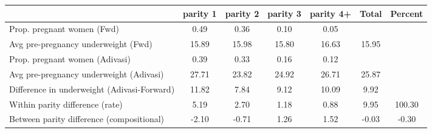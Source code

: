 \begin{tabular}{l*{6}{c}}
\toprule
            &\multicolumn{1}{c}{parity 1}&\multicolumn{1}{c}{parity 2}&\multicolumn{1}{c}{parity 3}&\multicolumn{1}{c}{parity 4+}&\multicolumn{1}{c}{Total}&\multicolumn{1}{c}{Percent}\\
\midrule
\midrule
Prop. pregnant women (Fwd)&        0.49&        0.36&        0.10&        0.05&            &            \\
Avg pre-pregnancy underweight (Fwd)&       15.89&       15.98&       15.80&       16.63&       15.95&            \\
Prop. pregnant women (Adivasi)&        0.39&        0.33&        0.16&        0.12&            &            \\
Avg pre-pregnancy underweight (Adivasi)&       27.71&       23.82&       24.92&       26.71&       25.87&            \\
Difference in underweight (Adivasi-Forward)&       11.82&        7.84&        9.12&       10.09&        9.92&            \\
Within parity difference (rate)&        5.19&        2.70&        1.18&        0.88&        9.95&      100.30\\
Between parity difference (compositional)&       -2.10&       -0.71&        1.26&        1.52&       -0.03&       -0.30\\
\bottomrule
\end{tabular}
